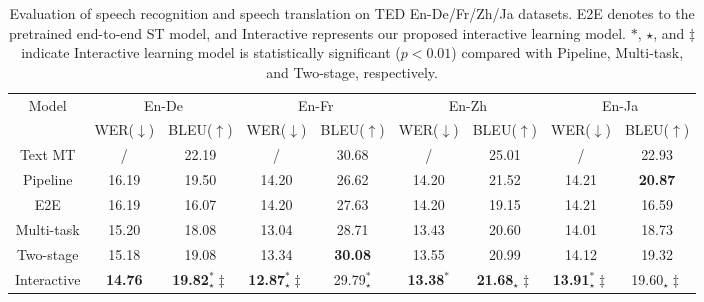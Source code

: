 \documentclass[letterpaper]{article} %
\begin{document}
\begin{table}[t]
	\centering
	\begin{tabular}{c|cc|cc|cc|cc}
		\hline
		\multirow{2}{*}{Model}    & \multicolumn{2}{c|}{En-De} & \multicolumn{2}{c|}{En-Fr} & \multicolumn{2}{c|}{En-Zh} & \multicolumn{2}{c}{En-Ja} \\
		\multicolumn{1}{c|}{}              & WER($\downarrow$)         & BLEU($\uparrow$)         & WER($\downarrow$)          & BLEU($\uparrow$)         & WER($\downarrow$)         & BLEU($\uparrow$)         & WER($\downarrow$)          & BLEU($\uparrow$)         \\ \cline{1-9}
		Text MT              & /              & 22.19           & /               & 30.68           & /              & 25.01           & /               & 22.93           \\
		\cline{1-9}
		Pipeline                                   & 16.19          & 19.50           & 14.20            & 26.62           & 14.20          & 21.52            & 14.21            &  \textbf{20.87}           \\
		E2E                                & 16.19          & 16.07           & 14.20            & 27.63           & 14.20          & 19.15           & 14.21            & 16.59           \\
		Multi-task                               & 15.20          & 18.08           & 13.04           & 28.71           & 13.43          & 20.60            & 14.01           & 18.73           \\
		Two-stage                              & 15.18          & 19.08           & 13.34           & \textbf{30.08}           & 13.55          & 20.99           & 14.12           & 19.32           \\
		\cline{1-9}
		Interactive   & \textbf{14.76}          & \textbf{19.82$_{\star}^{\ast}{\ddagger}$}           & \textbf{12.87$_{\star}^{\ast}{\ddagger}$}          & 29.79$_{\star}^{\ast}$           &  \textbf{13.38$^{\ast}$}          &  \textbf{21.68$_{\star}{\ddagger}$}           &  \textbf{13.91$_{\star}^{\ast}{\ddagger}$}           & 19.60$_{\star}\ddagger$           \\
		\hline
	\end{tabular}
	\caption{Evaluation of speech recognition and speech translation on TED En-De/Fr/Zh/Ja datasets. E2E denotes to the pretrained end-to-end ST model, and Interactive represents our proposed interactive learning model. %
		$\ast$, $\star$, and $\ddagger$ indicate Interactive learning model is statistically significant ($p<0.01$) compared with Pipeline, Multi-task, and Two-stage, respectively.}
	\label{tbl:overall}
\end{table}
\end{document}
